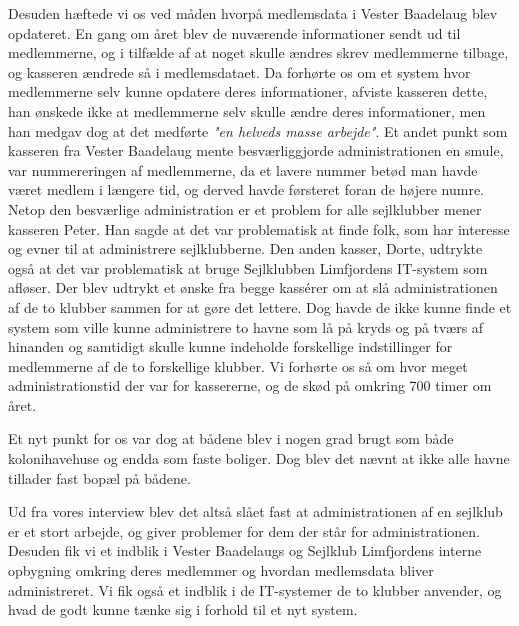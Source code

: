 Desuden hæftede vi os ved måden hvorpå medlemsdata i Vester Baadelaug blev opdateret. En gang om året blev de nuværende
informationer sendt ud til medlemmerne, og i tilfælde af at noget skulle ændres skrev medlemmerne tilbage, og kasseren
ændrede så i medlemsdataet. Da forhørte os om et system hvor medlemmerne selv kunne opdatere deres informationer,
afviste kasseren dette, han ønskede ikke at medlemmerne selv skulle ændre deres informationer, men han medgav dog at det
medførte \textit{"en helveds masse arbejde"}. Et andet punkt som kasseren fra Vester Baadelaug mente besværliggjorde
administrationen en smule, var nummereringen af medlemmerne, da et lavere nummer betød man havde været medlem i længere
tid, og derved havde førsteret foran de højere numre. Netop den besværlige administration er et problem for alle
sejlklubber mener kasseren Peter. Han sagde at det var problematisk at finde folk, som har interesse og evner til at
administrere sejlklubberne. Den anden kasser, Dorte, udtrykte også at det var problematisk at bruge Sejlklubben
Limfjordens IT-system som afløser. Der blev udtrykt et ønske fra begge kassérer om at slå administrationen af de to
klubber sammen for at gøre det lettere. Dog havde de ikke kunne finde et system som ville kunne administrere to havne
som lå på kryds og på tværs af hinanden og samtidigt skulle kunne indeholde forskellige indstillinger for medlemmerne af
de to forskellige klubber. Vi forhørte os så om hvor meget administrationstid der var for kassererne, og de skød på
omkring 700 timer om året.

Et nyt punkt for os var dog at bådene blev i nogen grad brugt som både kolonihavehuse og endda som faste boliger. Dog
blev det nævnt at ikke alle havne tillader fast bopæl på bådene. 
 
Ud fra vores interview blev det altså slået fast at administrationen af en sejlklub er et stort arbejde, og giver
problemer for dem der står for administrationen. Desuden fik vi et indblik i Vester Baadelaugs og Sejlklub Limfjordens
interne opbygning omkring deres medlemmer og hvordan medlemsdata bliver administreret. Vi fik også et indblik i de IT-systemer 
de to klubber anvender, og hvad de godt kunne tænke sig i forhold til et nyt system.
